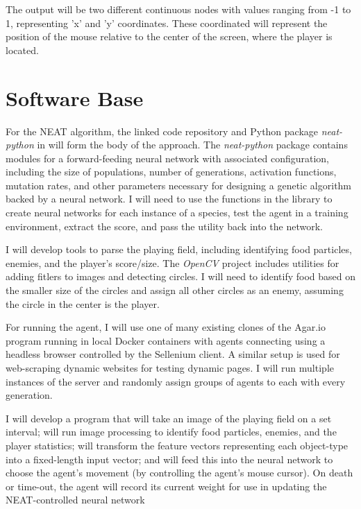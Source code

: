 \documentclass[11pt]{article}
\begin{document}
The output will be two different continuous nodes with values ranging from -1 to 1, representing 'x' and 'y' coordinates. These coordinated will represent the position of the mouse relative to the center of the screen, where the player is located.

\section*{Software Base}

For the NEAT algorithm, the linked code repository and Python package \textit{neat-python} in \cite{stanley2002evolving} will form the body of the approach. The \textit{neat-python} package contains modules for a forward-feeding neural network with associated configuration, including the size of populations, number of generations, activation functions, mutation rates, and other parameters necessary for designing a genetic algorithm backed by a neural network. I will need to use the functions in the library to create neural networks for each instance of a species, test the agent in a training environment, extract the score, and pass the utility back into the network.

I will develop tools to parse the playing field, including identifying food particles, enemies, and the player's score/size. The \textit{OpenCV} project includes utilities for adding fitlers to images and detecting circles. I will need to identify food based on the smaller size of the circles and assign all other circles as an enemy, assuming the circle in the center is the player.

For running the agent, I will use one of many existing clones of the Agar.io program running in local Docker containers with agents connecting using a headless browser controlled by the Sellenium client. A similar setup is used for web-scraping dynamic websites for testing dynamic pages. I will run multiple instances of the server and randomly assign groups of agents to each with every generation.

I will develop a program that will take an image of the playing field on a set interval; will run image processing to identify food particles, enemies, and the player statistics; will transform the feature vectors representing each object-type into a fixed-length input vector; and will feed this into the neural network to choose the agent's movement (by controlling the agent's mouse cursor). On death or time-out, the agent will record its current weight for use in updating the NEAT-controlled neural network
\end{document}
